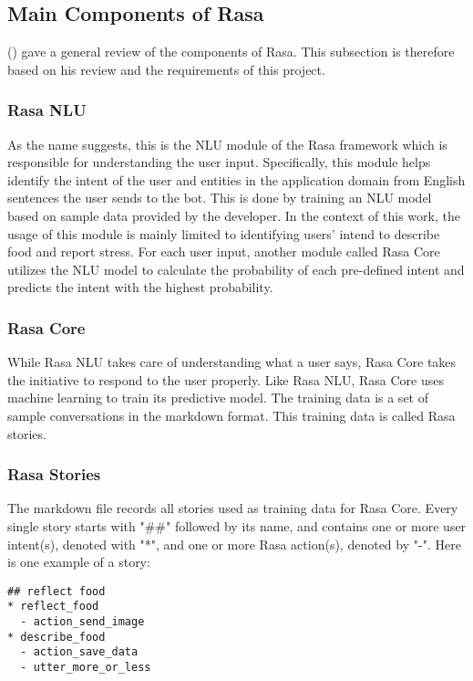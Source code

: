 \subsection{Main Components of Rasa}
\citeauthor{16_martin} (\citeyear{17_ludwig}) gave a general review of the components of Rasa. This subsection is therefore based on his review and the requirements of this project.

\subsubsection{Rasa NLU}
As the name suggests, this is the NLU module of the Rasa framework which is responsible for understanding the user input. Specifically, this module helps identify the intent of the user and entities in the application domain from English sentences the user sends to the bot. This is done by training an NLU model based on sample data provided by the developer. In the context of this work, the usage of this module is mainly limited to identifying users' intend to describe food and report stress. For each user input, another module called Rasa Core utilizes the NLU model to calculate the probability of each pre-defined intent and predicts the intent with the highest probability.

\subsubsection{Rasa Core}
While Rasa NLU takes care of understanding what a user says, Rasa Core takes the initiative to respond to the user properly. Like Rasa NLU, Rasa Core uses machine learning to train its predictive model. The training data is a set of sample conversations in the markdown format. This training data is called Rasa stories.

\subsubsection{Rasa Stories}
The markdown file records all stories used as training data for Rasa Core. Every single story starts with "\#\#" followed by its name, and contains one or more user intent(s), denoted with "*", and one or more Rasa action(s), denoted by "-". Here is one example of a story:\bigskip

\begin{lstlisting}
## reflect food
* reflect_food
  - action_send_image
* describe_food
  - action_save_data
  - utter_more_or_less
\end{lstlisting}

